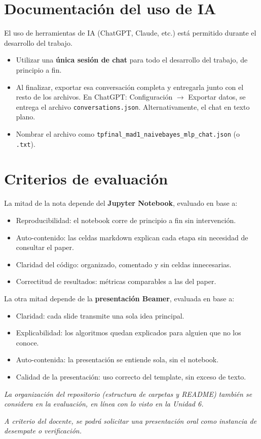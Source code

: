 \documentclass[11pt,a4paper]{article}
\newcommand{\codigo}[1]{\texttt{#1}}
\begin{document}
\section{Documentaci\'on del uso de IA}
El uso de herramientas de IA (ChatGPT, Claude, etc.) est\'a permitido durante el desarrollo del trabajo.
\begin{itemize}[leftmargin=2em,itemsep=2pt]
    \item Utilizar una \textbf{\'unica sesi\'on de chat} para todo el desarrollo del trabajo, de principio a fin.
    \item Al finalizar, exportar esa conversaci\'on completa y entregarla junto con el resto de los archivos. En ChatGPT: Configuraci\'on $\rightarrow$ Exportar datos, se entrega el archivo \codigo{conversations.json}. Alternativamente, el chat en texto plano.
    \item Nombrar el archivo como \codigo{tpfinal\_mad1\_naivebayes\_mlp\_chat.json} (o \codigo{.txt}).
\end{itemize}

\section{Criterios de evaluaci\'on}
La mitad de la nota depende del \textbf{Jupyter Notebook}, evaluado en base a:
\begin{itemize}[leftmargin=2em,itemsep=2pt]
    \item Reproducibilidad: el notebook corre de principio a fin sin intervenci\'on.
    \item Auto-contenido: las celdas markdown explican cada etapa sin necesidad de consultar el paper.
    \item Claridad del c\'odigo: organizado, comentado y sin celdas innecesarias.
    \item Correctitud de resultados: m\'etricas comparables a las del paper.
\end{itemize}

La otra mitad depende de la \textbf{presentaci\'on Beamer}, evaluada en base a:
\begin{itemize}[leftmargin=2em,itemsep=2pt]
    \item Claridad: cada slide transmite una sola idea principal.
    \item Explicabilidad: los algoritmos quedan explicados para alguien que no los conoce.
    \item Auto-contenida: la presentaci\'on se entiende sola, sin el notebook.
    \item Calidad de la presentaci\'on: uso correcto del template, sin exceso de texto.
\end{itemize}

\textit{La organizaci\'on del repositorio (estructura de carpetas y README) tambi\'en se considera en la evaluaci\'on, en l\'inea con lo visto en la Unidad 6.}

\textit{A criterio del docente, se podr\'a solicitar una presentaci\'on oral como instancia de desempate o verificaci\'on.}
\end{document}
